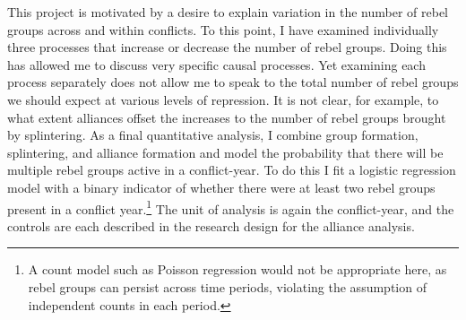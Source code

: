\documentclass[12pt,]{book}
\let\rmarkdownfootnote\footnote%
\def\footnote{\protect\rmarkdownfootnote}
\theoremstyle{definition}
\theoremstyle{definition}
\theoremstyle{definition}
\theoremstyle{remark}
\begin{document}
This project is motivated by a desire to explain variation in the number
of rebel groups across and within conflicts. To this point, I have
examined individually three processes that increase or decrease the
number of rebel groups. Doing this has allowed me to discuss very
specific causal processes. Yet examining each process separately does
not allow me to speak to the total number of rebel groups we should
expect at various levels of repression. It is not clear, for example, to
what extent alliances offset the increases to the number of rebel groups
brought by splintering. As a final quantitative analysis, I combine
group formation, splintering, and alliance formation and model the
probability that there will be multiple rebel groups active in a
conflict-year. To do this I fit a logistic regression model with a
binary indicator of whether there were at least two rebel groups present
in a conflict year.\footnote{A count model such as Poisson regression
  would not be appropriate here, as rebel groups can persist across time
  periods, violating the assumption of independent counts in each
  period.} The unit of analysis is again the conflict-year, and the
controls are each described in the research design for the alliance
analysis.
\end{document}
